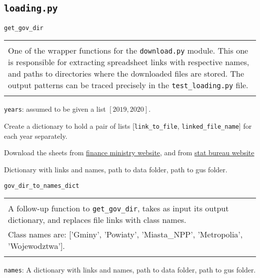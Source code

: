\documentclass[12pt,a4paper]{article}
\newcommand{\code}[1]{\texttt{#1}}
\newenvironment{func}[1]
    {\begin{center}
    #1\\[1ex]
    \begin{tabular}{|p{0.9\textwidth}|}
    \hline\\
    }
    {
    \\\\\hline
    \end{tabular}
    \end{center}
    }
\begin{document}
\subsection{\code{loading.py}}
\begin{func}{\code{get\_gov\_dir}}
One of the wrapper functions for the \code{download.py} module. This one is responsible for extracting spreadsheet links with respective names, and paths to directories where the downloaded files are stored. The output patterns can be traced precisely in the \code{test\_loading.py} file.
\end{func}

\begin{details}{
\item \code{years}: assumed to be given a list $[2019, 2020]$.
}{
\item Create a dictionary to hold a pair of lists [\code{link\_to\_file}, \code{linked\_file\_name}] for each year separately.
\item Download the sheets from \href{https://www.gov.pl/web/finanse/udzialy-za-2020-r}{finance ministry website}, and from \href{https://stat.gov.pl/obszary-tematyczne/ludnosc/ludnosc/ludnosc-stan-i-struktura-ludnosci-oraz-ruch-naturalny-w-przekroju-terytorialnym-stan-w-dniu-31-12-2020,6,29.html}{stat bureau website}
}{
\item Dictionary with links and names, path to data folder, path to gus folder.
}
\end{details}

\begin{func}{\code{gov\_dir\_to\_names\_dict}}
A follow-up function to \code{get\_gov\_dir}, takes as input its output dictionary, and replaces file links with class names. \\Class names are: ['Gminy', 'Powiaty', 'Miasta\_NPP', 'Metropolia', 'Wojewodztwa'].

\end{func}

\begin{details}{
\item \code{names}: A dictionary with links and names, path to data folder, path to gus folder.
}{
\item
}{
\item
}
\end{details}
\end{document}
